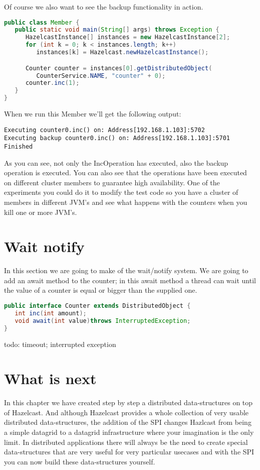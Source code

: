 Of course we also want to see the backup functionality in action.
\begin{lstlisting}[language=java]
public class Member {
   public static void main(String[] args) throws Exception {
      HazelcastInstance[] instances = new HazelcastInstance[2];
      for (int k = 0; k < instances.length; k++) 
         instances[k] = Hazelcast.newHazelcastInstance();

      Counter counter = instances[0].getDistributedObject(
         CounterService.NAME, "counter" + 0);
      counter.inc(1);
   }
}
\end{lstlisting}
When we run this Member we'll get the following output:
\begin{lstlisting}
Executing counter0.inc() on: Address[192.168.1.103]:5702
Executing backup counter0.inc() on: Address[192.168.1.103]:5701
Finished
\end{lstlisting}
As you can see, not only the IncOperation has executed, also the backup operation is executed. You can also see that the operations have been executed on different cluster members to guarantee high availability. One of the experiments you could do it to modify the test code so you have a cluster of members in different JVM's and see what happens with the counters when you kill one or more JVM's. 

\section{Wait notify}
In this section we are going to make of the wait/notify system. We are going to add an await method to the counter; in this await method a thread can wait until the value of a counter is equal or bigger than the supplied one.

\begin{lstlisting}[language=java]
public interface Counter extends DistributedObject {
   int inc(int amount);
   void await(int value)throws InterruptedException;
}
\end{lstlisting}


todo: timeout; interrupted exception

\section{What is next}
In this chapter we have created step by step a distributed data-structures on top of Hazelcast. And although Hazelcast provides a whole collection of very usable distributed data-structures, the addition of the SPI changes Hazlcast from being a simple datagrid to a datagrid infrastructure where your imagination is the only limit. In distributed applications there will always be the need to create special data-structures that are very useful for very particular usecases and with the SPI you can now build these data-structures yourself.
